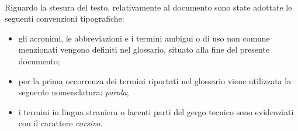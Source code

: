 \noindent \\Riguardo la stesura del testo, relativamente al documento sono state adottate le seguenti convenzioni tipografiche:
\begin{itemize}
	\item gli acronimi, le abbreviazioni e i termini ambigui o di uso non comune menzionati vengono definiti nel glossario, situato alla fine del presente documento;
	\item per la prima occorrenza dei termini riportati nel glossario viene utilizzata la seguente nomenclatura: \emph{parola}\glsfirstoccur;
	\item i termini in lingua straniera o facenti parti del gergo tecnico sono evidenziati con il carattere \emph{corsivo}.
\end{itemize}